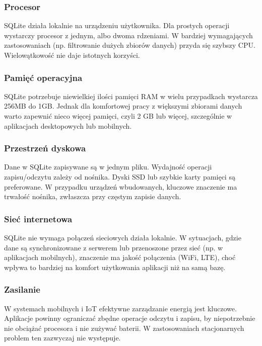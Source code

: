 \documentclass[letterpaper,10pt,polish]{sphinxmanual}
\begin{document}
\subsubsection{Procesor}
\label{\detokenize{rozdzial2/Sprzet-dla-bazy-danych/source/SprzetDlaBazyDanych:id1}}
\sphinxAtStartPar
SQLite działa lokalnie na urządzeniu użytkownika. Dla prostych operacji wystarczy procesor z jednym, albo dwoma rdzeniami. W bardziej wymagających zastosowaniach (np. filtrowanie dużych zbiorów danych) przyda się szybszy CPU. Wielowątkowość nie daje istotnych korzyści.


\subsubsection{Pamięć operacyjna}
\label{\detokenize{rozdzial2/Sprzet-dla-bazy-danych/source/SprzetDlaBazyDanych:id2}}
\sphinxAtStartPar
SQLite potrzebuje niewielkiej ilości pamięci RAM w wielu przypadkach wystarcza 256MB do 1GB. Jednak dla komfortowej pracy z większymi zbiorami danych warto zapewnić nieco więcej pamięci, czyli 2 GB lub więcej, szczególnie w aplikacjach desktopowych lub mobilnych.


\subsubsection{Przestrzeń dyskowa}
\label{\detokenize{rozdzial2/Sprzet-dla-bazy-danych/source/SprzetDlaBazyDanych:id3}}
\sphinxAtStartPar
Dane w SQLite zapisywane są w jednym pliku. Wydajność operacji zapisu/odczytu zależy od nośnika. Dyski SSD lub szybkie karty pamięci są preferowane. W przypadku urządzeń wbudowanych, kluczowe znaczenie ma trwałość nośnika, zwłaszcza przy częstym zapisie danych.


\subsubsection{Sieć internetowa}
\label{\detokenize{rozdzial2/Sprzet-dla-bazy-danych/source/SprzetDlaBazyDanych:id4}}
\sphinxAtStartPar
SQLite nie wymaga połączeń sieciowych \textendash{} działa lokalnie. W sytuacjach, gdzie dane są synchronizowane z serwerem lub przenoszone przez sieć (np. w aplikacjach mobilnych), znaczenie ma jakość połączenia (Wi\sphinxhyphen{}Fi, LTE), choć wpływa to bardziej na komfort użytkowania aplikacji niż na samą bazę.


\subsubsection{Zasilanie}
\label{\detokenize{rozdzial2/Sprzet-dla-bazy-danych/source/SprzetDlaBazyDanych:id5}}
\sphinxAtStartPar
W systemach mobilnych i IoT efektywne zarządzanie energią jest kluczowe. Aplikacje powinny ograniczać zbędne operacje odczytu i zapisu, by niepotrzebnie nie obciążać procesora i nie zużywać baterii. W zastosowaniach stacjonarnych problem ten zazwyczaj nie występuje.
\end{document}
